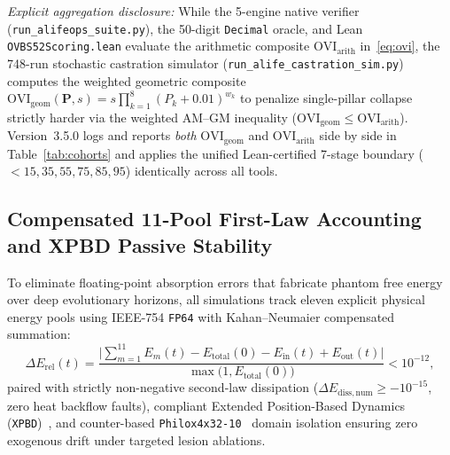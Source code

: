 \documentclass[11pt,reqno]{amsart}
\theoremstyle{plain}
\theoremstyle{definition}
\theoremstyle{remark}
\newcommand{\code}[1]{{\footnotesize\nolinkurl{#1}}}
\begin{document}
\emph{Explicit aggregation disclosure:} While the 5-engine native verifier (\code{run_alifeops_suite.py}), the 50-digit \code{Decimal} oracle, and Lean \code{OVBS52Scoring.lean} evaluate the arithmetic composite $\mathrm{OVI}_{\mathrm{arith}}$ in~\eqref{eq:ovi}, the 748-run stochastic castration simulator (\code{run_alife_castration_sim.py}) computes the weighted geometric composite $\mathrm{OVI}_{\mathrm{geom}}(\mathbf{P}, s) = s \prod_{k=1}^{8}(P_k + 0.01)^{w_k}$ to penalize single-pillar collapse strictly harder via the weighted AM--GM inequality ($\mathrm{OVI}_{\mathrm{geom}} \le \mathrm{OVI}_{\mathrm{arith}}$). Version~3.5.0 logs and reports \emph{both} $\mathrm{OVI}_{\mathrm{geom}}$ and $\mathrm{OVI}_{\mathrm{arith}}$ side by side in Table~\ref{tab:cohorts} and applies the unified Lean-certified 7-stage boundary ($<15, 35, 55, 75, 85, 95$) identically across all tools.

\subsection{Compensated 11-Pool First-Law Accounting and XPBD Passive Stability}
To eliminate floating-point absorption errors that fabricate phantom free energy over deep evolutionary horizons, all simulations track eleven explicit physical energy pools using IEEE-754 \code{FP64} with Kahan--Neumaier compensated summation:
\begin{equation}
  \Delta E_{\mathrm{rel}}(t) = \frac{\bigl|\sum_{m=1}^{11} E_m(t) - E_{\mathrm{total}}(0) - E_{\mathrm{in}}(t) + E_{\mathrm{out}}(t)\bigr|}{\max\bigl(1, E_{\mathrm{total}}(0)\bigr)} < 10^{-12},
  \label{eq:firstlaw}
\end{equation}
paired with strictly non-negative second-law dissipation ($\Delta E_{\mathrm{diss,num}} \ge -10^{-15}$, zero heat backflow faults), compliant Extended Position-Based Dynamics (\code{XPBD})~\cite{macklin2016xpbd}, and counter-based \code{Philox4x32-10}~\cite{salmon2011parallel} domain isolation ensuring zero exogenous drift under targeted lesion ablations.
\end{document}
